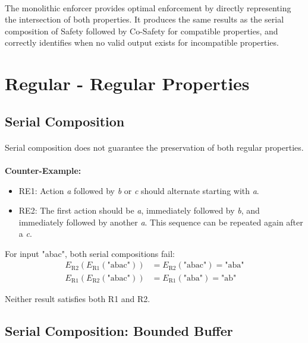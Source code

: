 \paragraph{}
The monolithic enforcer provides optimal enforcement by directly representing the intersection of both properties. It produces the same results as the serial composition of Safety followed by Co-Safety for compatible properties, and correctly identifies when no valid output exists for incompatible properties.

\section{Regular - Regular Properties}

\subsection{Serial Composition}
\paragraph{}
Serial composition does not guarantee the preservation of both regular properties.

\paragraph{}
\textbf{Counter-Example:}
\begin{itemize}
    \item RE1: Action \textit{a} followed by \textit{b} or \textit{c} should alternate starting with \textit{a}.
    \item RE2: The first action should be \textit{a}, immediately followed by \textit{b}, and immediately followed by another \textit{a}. This sequence can be repeated again after a \textit{c}.
\end{itemize}

For input "abac", both serial compositions fail:
\begin{align*}
    E_{\text{R2}}(E_{\text{R1}}(\text{"abac"})) &= E_{\text{R2}}(\text{"abac"}) = \text{"aba"} \\
    E_{\text{R1}}(E_{\text{R2}}(\text{"abac"})) &= E_{\text{R1}}(\text{"aba"}) = \text{"ab"}
\end{align*}

Neither result satisfies both R1 and R2.

\subsection{Serial Composition: Bounded Buffer}

